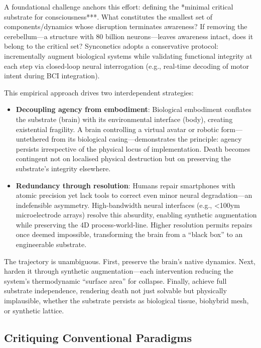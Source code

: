 \documentclass[10pt]{article}
\begin{document}
\begin{sloppypar}
  A foundational challenge anchors this effort: defining the *minimal critical substrate for consciousness***. What constitutes the smallest set of components/dynamics whose disruption terminates awareness? If removing the cerebellum—a structure with 80 billion neurons—leaves awareness intact, does it belong to the critical set? Synconetics adopts a conservative protocol: incrementally augment biological systems while validating functional integrity at each step via closed-loop neural interrogation (e.g., real-time decoding of motor intent during BCI integration).

  This empirical approach drives two interdependent strategies:
  \begin{itemize}
    \item \textbf{Decoupling agency from embodiment}: Biological embodiment conflates the substrate (brain) with its environmental interface (body), creating existential fragility. A brain controlling a virtual avatar or robotic form—untethered from its biological casing—demonstrates the principle: agency persists irrespective of the physical locus of implementation. Death becomes contingent not on localised physical destruction but on preserving the substrate’s integrity elsewhere.

    \item \textbf{Redundancy through resolution}: Humans repair smartphones with atomic precision yet lack tools to correct even minor neural degradation—an indefensible asymmetry. High-bandwidth neural interfaces (e.g., <100ym microelectrode arrays) resolve this absurdity, enabling synthetic augmentation while preserving the 4D process-world-line. Higher resolution permits repairs once deemed impossible, transforming the brain from a “black box” to an engineerable substrate.
  \end{itemize}

  The trajectory is unambiguous. First, preserve the brain’s native dynamics. Next, harden it through synthetic augmentation—each intervention reducing the system’s thermodynamic “surface area” for collapse. Finally, achieve full substrate independence, rendering death not just solvable but physically implausible, whether the substrate persists as biological tissue, biohybrid mesh, or synthetic lattice.

  \subsection{Critiquing Conventional Paradigms}
  \label{sec:new-paradigm}


\end{sloppypar}
\end{document}
